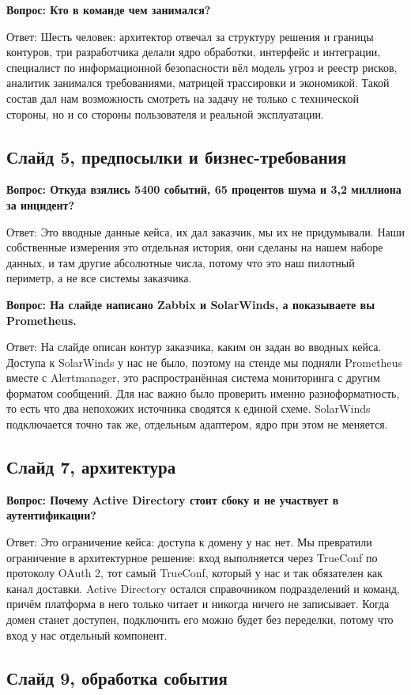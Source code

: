 \documentclass[11pt]{article}
\newcommand{\qa}[2]{%
\par\vspace{7pt}%
{\bfseries Вопрос: #1}\par\vspace{2pt}
{Ответ: #2}\par\vspace{4pt}}
\begin{document}
\qa{Кто в команде чем занимался?}
{Шесть человек: архитектор отвечал за структуру решения и границы контуров,
три разработчика делали ядро обработки, интерфейс и интеграции, специалист по
информационной безопасности вёл модель угроз и реестр рисков, аналитик
занимался требованиями, матрицей трассировки и экономикой. Такой состав дал
нам возможность смотреть на задачу не только с технической стороны, но и со
стороны пользователя и реальной эксплуатации.}

\subsection{Слайд 5, предпосылки и бизнес-требования}

\qa{Откуда взялись 5400 событий, 65 процентов шума и 3,2 миллиона за
инцидент?}
{Это вводные данные кейса, их дал заказчик, мы их не придумывали. Наши
собственные измерения это отдельная история, они сделаны на нашем наборе
данных, и там другие абсолютные числа, потому что это наш пилотный периметр,
а не все системы заказчика.}

\qa{На слайде написано Zabbix и SolarWinds, а показываете вы Prometheus.}
{На слайде описан контур заказчика, каким он задан во вводных кейса. Доступа
к SolarWinds у нас не было, поэтому на стенде мы подняли Prometheus вместе с
Alertmanager, это распространённая система мониторинга с другим форматом
сообщений. Для нас важно было проверить именно разноформатность, то есть что
два непохожих источника сводятся к единой схеме. SolarWinds подключается точно
так же, отдельным адаптером, ядро при этом не меняется.}

\subsection{Слайд 7, архитектура}

\qa{Почему Active Directory стоит сбоку и не участвует в аутентификации?}
{Это ограничение кейса: доступа к домену у нас нет. Мы превратили ограничение
в архитектурное решение: вход выполняется через TrueConf по протоколу
OAuth 2, тот самый TrueConf, который у нас и так обязателен как канал
доставки. Active Directory остался справочником подразделений и команд, причём
платформа в него только читает и никогда ничего не записывает. Когда домен
станет доступен, подключить его можно будет без переделки, потому что вход у
нас отдельный компонент.}

\subsection{Слайд 9, обработка события}
\end{document}
